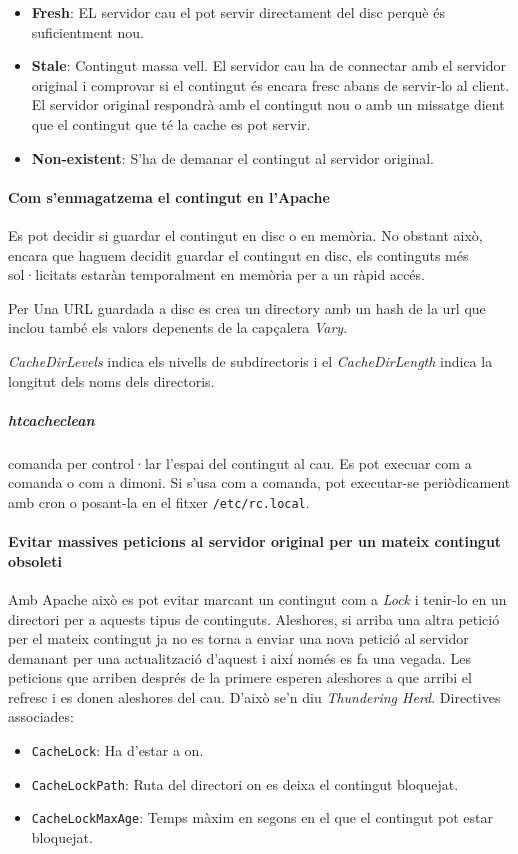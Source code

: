 \documentclass[a4paper, 11pt]{article}
\begin{document}
\begin{itemize}
	\item \textbf{Fresh}: EL servidor cau el pot servir directament del disc perquè \'es suficientment nou.
	\item \textbf{Stale}: Contingut massa vell. El servidor cau ha de connectar amb el servidor original i comprovar si el contingut \'es encara fresc abans de servir-lo al client. El servidor original respondrà amb el contingut nou o amb un missatge dient que el contingut que t\'e la cache es pot servir.
	\item \textbf{Non-existent}: S'ha de demanar el contingut al servidor original. 
\end{itemize}

\paragraph{Com s'enmagatzema el contingut en l'Apache } Es pot decidir si guardar el contingut en disc o en memòria. No obstant això, encara que haguem decidit guardar el contingut en disc, els continguts m\'es sol·licitats estaràn temporalment en memòria per a un ràpid acc\'es.

Per Una URL guardada a disc es crea un directory amb un hash de la url que inclou tamb\'e els valors depenents de la capçalera \textit{Vary}.

\textit{CacheDirLevels} indica els nivells de subdirectoris i el \textit{CacheDirLength} indica la longitut dels noms dels directoris.

\subparagraph{htcacheclean} comanda per control·lar l'espai del contingut al cau. Es pot execuar com a comanda o com a dimoni. Si s'usa com a comanda, pot executar-se periòdicament amb cron o posant-la en el fitxer \verb+/etc/rc.local+.

\paragraph{Evitar massives peticions al servidor original per un mateix contingut obsoleti \\}

Amb Apache això es pot evitar marcant un contingut com a \textit{Lock} i tenir-lo en un directori per a aquests tipus de continguts. Aleshores, si arriba una altra petició per el mateix contingut ja no es torna a enviar una nova petició al servidor demanant per una actualització d'aquest i així nom\'es es fa una vegada. Les peticions que arriben despr\'es de la primere esperen aleshores a que arribi el refresc i es donen aleshores del cau. D'això se'n diu \textit{Thundering Herd}. Directives associades:
\begin{itemize}
	\item \verb+CacheLock+: Ha d'estar a on.
	\item \verb+CacheLockPath+: Ruta del directori on es deixa el contingut bloquejat.
	\item \verb+CacheLockMaxAge+: Temps màxim en segons en el que el contingut pot estar bloquejat.
\end{itemize}
\end{document}
